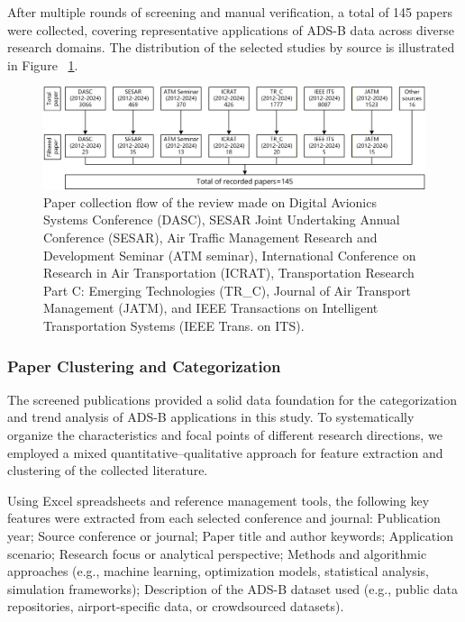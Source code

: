 After multiple rounds of screening and manual verification, a total of 145 papers were collected, covering representative applications of ADS-B data across diverse research domains. The distribution of the selected studies by source is illustrated in Figure ~\ref{fig:placeholder}.


\begin{figure}
	\centering
	\includegraphics[width=1\linewidth]{paper_selection.png}
	\caption{Paper collection flow of the review made on Digital Avionics Systems Conference (DASC), SESAR Joint Undertaking Annual Conference (SESAR), Air Traffic Management Research and Development Seminar (ATM seminar), International Conference on Research in Air Transportation (ICRAT), Transportation Research Part C: Emerging Technologies (TR\_C), Journal of Air Transport Management (JATM), and IEEE Transactions on Intelligent Transportation Systems (IEEE Trans. on ITS).}
	\label{fig:placeholder}
\end{figure}


\subsubsection{Paper Clustering and Categorization}

The screened publications provided a solid data foundation for the categorization and trend analysis of ADS-B applications in this study. To systematically organize the characteristics and focal points of different research directions, we employed a mixed quantitative–qualitative approach for feature extraction and clustering of the collected literature.

Using Excel spreadsheets and reference management tools, the following key features were extracted from each selected conference and journal:
Publication year; Source conference or journal; Paper title and author keywords; Application scenario; Research focus or analytical perspective; Methods and algorithmic approaches (e.g., machine learning, optimization models, statistical analysis, simulation frameworks); Description of the ADS-B dataset used (e.g., public data repositories, airport-specific data, or crowdsourced datasets).


